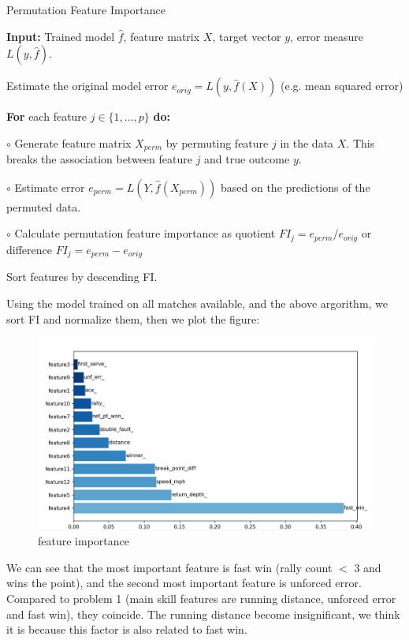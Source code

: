 \begin{algorithm}[H]
    \caption{Permutation Feature Importance}  
    \textbf{Input:} Trained model $\hat{f}$, feature matrix $X$, target vector $y$, error measure $L(y, \hat{f})$.  
      
    Estimate the original model error $e_{orig} = L(y, \hat{f}(X))$ (e.g. mean squared error)  
      
    \textbf{For} each feature $j \in \{1, ..., p\}$ \textbf{do:}  
      
    \quad\quad $\circ$ Generate feature matrix $X_{perm}$ by permuting feature $j$ in the data $X$. This breaks the association between feature $j$ and true outcome $y$.  
      
    \quad\quad $\circ$ Estimate error $e_{perm} = L(Y, \hat{f}(X_{perm}))$ based on the predictions of the permuted data.  
      
    \quad\quad $\circ$ Calculate permutation feature importance as quotient $FI_j = e_{perm} / e_{orig}$ or difference $FI_j = e_{perm} - e_{orig}$  
      
    Sort features by descending FI.
\end{algorithm}

Using the model trained on all matches available, and the above argorithm,
we sort FI and normalize them, then we plot the figure:

\begin{figure}[H]
    \centering
    \includegraphics[scale=0.6]{mainmatter/imgs/8.png}
    \caption{feature importance}
\end{figure}

We can see that the most important feature is fast win (rally count $<$ 3 and wins the point),
and the second most important feature is unforced error. Compared to problem 1 (main skill features are
running distance, unforced error and fast win), they coincide. The running distance become insignificant, 
we think it is because this factor is also related to fast win.

